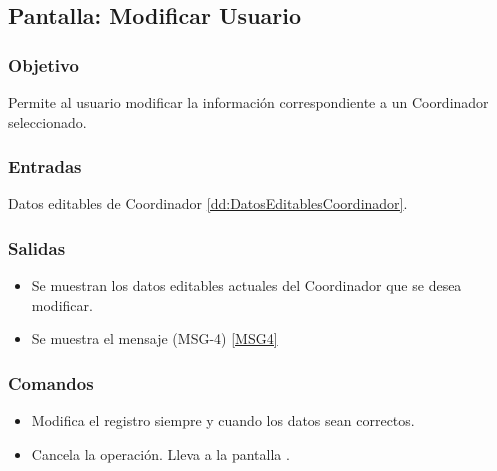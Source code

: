 \subsection{Pantalla: Modificar Usuario}

\subsubsection{Objetivo}
Permite al usuario modificar la información correspondiente a un Coordinador seleccionado.


\subsubsection{Entradas}
Datos editables de Coordinador \ref{dd:DatosEditablesCoordinador}.

\subsubsection{Salidas}
\begin{itemize}
 \item Se muestran los datos editables actuales del Coordinador que se desea modificar.
 \item Se muestra el mensaje (MSG-4) \ref{MSG4} 
\end{itemize}

\subsubsection{Comandos}
\begin{itemize}
 \item {} Modifica el registro siempre y cuando los datos sean correctos.
 \item {} Cancela la operación. Lleva a la pantalla .
\end{itemize}
